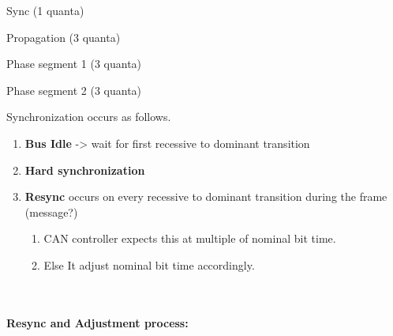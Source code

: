 Sync (1 quanta)

Propagation (3 quanta)

Phase segment 1 (3 quanta)
 
Phase segment 2 (3 quanta)


Synchronization occurs as follows. 

\begin{enumerate}
\def\labelenumi{\arabic{enumi}.}
\item
  \textbf{Bus Idle} -\textgreater{} wait for first recessive to dominant
  transition
\item
 \textbf{ Hard synchronization}
\item
  \textbf{Resync} occurs on every recessive to dominant transition during the
  frame (message?)

  \begin{enumerate}
  \def\labelenumii{\alph{enumii}.}
  \item
    CAN controller expects this at multiple of nominal bit time.
  \item
    Else It adjust nominal bit time accordingly.
  \end{enumerate}
\end{enumerate}

~

\paragraph{Resync and Adjustment process:}


